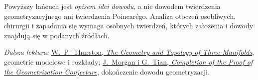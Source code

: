 Powyższy łańcuch jest \emph{opisem idei dowodu}, a nie
dowodem twierdzenia geometryzacyjnego ani twierdzenia
Poincarégo. Analiza otoczeń osobliwych, chirurgii i zapadania
się wymaga osobnych twierdzeń, których założenia i dowody
znajdują się w podanych źródłach.

\par\smallskip
{\footnotesize\noindent\emph{Dalsza lektura:}
\href{https://library.slmath.org/nonmsri/gt3m/PDF/Thurston-gt3m.pdf}
{W.\ P.\ Thurston, \emph{The Geometry and Topology of
Three-Manifolds}}, geometrie modelowe i rozkłady;
\href{https://arxiv.org/pdf/0809.4040}
{J.\ Morgan i G.\ Tian, \emph{Completion of the Proof of the
Geometrization Conjecture}}, dokończenie dowodu geometryzacji.\par}
